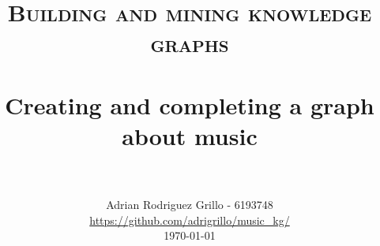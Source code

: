 \documentclass[12pt,a4paper]{article}
\title{
		\usefont{OT1}{bch}{b}{n}
		\normalfont \normalsize \textsc{Building and mining knowledge graphs} \\ [25pt]
		\horrule{0.5pt} \\[0.4cm]
		\huge Creating and completing a graph about music \\
		\horrule{2pt} \\[0.5cm]
}
\author{
		\normalfont 								\normalsize
        Adrian Rodriguez Grillo - 6193748\\
        \small\url{https://github.com/adrigrillo/music\_kg/} \\[-3pt]		\normalsize
        \today
}
\date{}
\numberwithin{equation}{section}	%
\numberwithin{figure}{section}		%
\numberwithin{table}{section}		%
\begin{document}
\maketitle












{\tiny\printbibliography}
\end{document}
